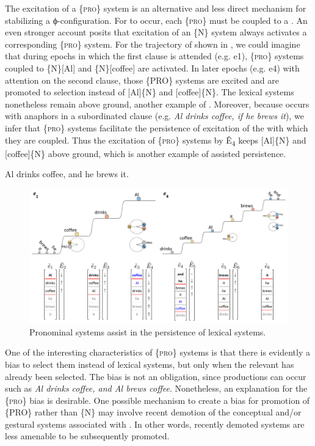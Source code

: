   The excitation of a \{\textsc{pro}\} system is an alternative and less direct mechanism for stabilizing a ϕ-con\-fig\-u\-ra\-tion. For  to occur, each \{\textsc{pro}\} must be coupled to a . An even stronger account posits that excitation of an \{N\} system always activates a corresponding \{\textsc{pro}\} system. For the trajectory of  shown in {}, we could imagine that during epochs in which the first clause is attended (e.g. e1), \{\textsc{pro}\} systems coupled to \{N\}[Al] and \{N\}[coffee] are activated. In later epochs (e.g. e4) with attention on the second clause, those \{PRO\} systems are excited and are promoted to selection instead of [Al]\{N\} and [coffee]\{N\}. The lexical systems nonetheless remain above ground, another example of . Moreover, because  occurs with anaphors in a subordinated clause (e.g. \textit{Al drinks coffee, if he brews it}), we infer that \{\textsc{pro}\} systems facilitate the persistence of excitation of the  with which they are coupled. Thus the excitation of \{\textsc{pro}\} systems by Ê\textsubscript{4} keeps [Al]\{N\} and [coffee]\{N\} above ground, which is another example of assisted persistence.

  \ea\label{ex:7:10}
  {Al drinks coffee, and he brews it.}
\z
  
\begin{figure}
\includegraphics[width=\textwidth]{figures/Tilsen-img153.png}
\caption{Pronominal systems assist in the persistence of lexical systems.}
\label{fig:7:9}
\end{figure}
 

  One of the interesting characteristics of \{\textsc{pro}\} systems is that there is evidently a bias to select them instead of lexical systems, but only when the relevant  has already been selected. The bias is not an obligation, since productions can occur such as \textit{Al drinks coffee, and Al brews coffee}. Nonetheless, an explanation for the \{\textsc{pro}\} bias is desirable. One possible mechanism to create a bias for promotion of \{PRO\} rather than \{N\} may involve recent demotion of the conceptual and/or gestural systems associated with . In other words, recently demoted systems are less amenable to be subsequently promoted.

